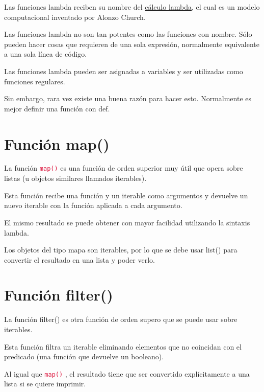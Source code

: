 \documentclass{report}
\newcommand{\link}[2]{\href{#1}{\underline{#2}}}
\newcommand{\ttt}[1]{
  \textcolor{Crimson}{\texttt{#1}}
}
\begin{document}
Las funciones lambda reciben su nombre del \link{https://es.wikipedia.org/wiki/C\%C3\%A1lculo_lambda}{cálculo lambda}, el cual es un modelo computacional inventado por Alonzo Church.\smallskip

Las funciones lambda no son tan potentes como las funciones con nombre. Sólo pueden hacer cosas que requieren de una sola expresión, normalmente equivalente a una sola línea de código.


Las funciones lambda pueden ser asignadas a variables y ser utilizadas como funciones regulares.


Sin embargo, rara vez existe una buena razón para hacer esto. Normalmente es mejor definir una función con def.

\section{Función map()}

La función \ttt{map()} es una función de orden superior muy útil que opera sobre listas (u objetos similares llamados iterables).\smallskip

Esta función recibe una función y un iterable como argumentos y devuelve un nuevo iterable con la función aplicada a cada argumento.


El mismo resultado se puede obtener con mayor facilidad utilizando la sintaxis lambda.


Los objetos del tipo mapa son iterables, por lo que se debe usar list() para convertir el resultado en una lista y poder verlo.

\section{Función filter()}

La función filter() es otra función de orden supero que se puede usar sobre iterables.\smallskip

Esta función filtra un iterable eliminando elementos que no coincidan con el predicado (una función que devuelve un booleano).


Al igual que \ttt{map()}, el resultado tiene que ser convertido explícitamente a una lista si se quiere imprimir.
\end{document}
